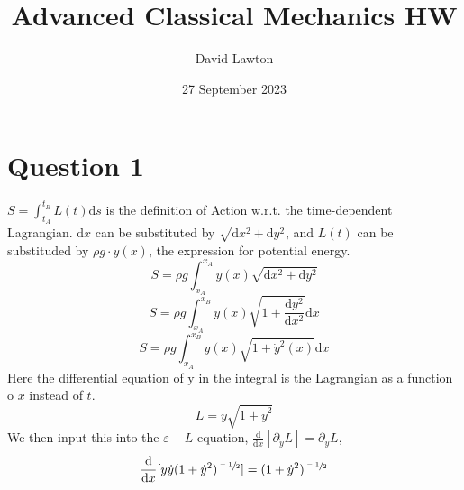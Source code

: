 \documentclass[11pt,oneside,a4paper]{article}
\begin{document}
\title{Advanced Classical Mechanics HW}
\author{David Lawton}
\date{27 September 2023}
\maketitle
\vfill
\tableofcontents
\clearpage


\section{Question 1}
	$ S = \int_{t_A}^{t_B} L(t) \mathrm{d}s $ is the definition of Action w.r.t. the time-dependent Lagrangian. d$x$ can be substituted by $\sqrt{\mathrm{d}x^2+\mathrm{d}y^2}$, and $L(t)$ can be substituded by $\rho g \cdot y(x)$, the expression for potential energy.
	$$ S = \rho g \int_{x_A}^{x_A} y(x) \sqrt{\mathrm{d}x^2 + \mathrm{d}y^2} $$
	$$ S = \rho g \int_{x_A}^{x_B} y(x) \sqrt{1 + \frac{\mathrm{d}y^2}{\mathrm{d}x^2}}\mathrm{d}x $$
	$$ S = \rho g \int_{x_A}^{x_B} y(x) \sqrt{1+\dot y^2(x)} \mathrm{d}x $$
	Here the differential equation of y in the integral is the Lagrangian as a function o $x$ instead of $t$.
	$$ L = y \sqrt{1 + \dot y^2} $$
	We then input this into the $\varepsilon -L $ equation, $ \frac{\mathrm{d}}{\mathrm{d}x}[\partial _{\dot y} L] = \partial _y L $,
	$$ \frac{\mathrm{d}}{\mathrm{d}x} [y \dot y (1 + \dot y^2)^{\sfrac{-1}{2}}] = (1+ \dot y^2)^{\sfrac{-1}{2}} $$
\end{document}
